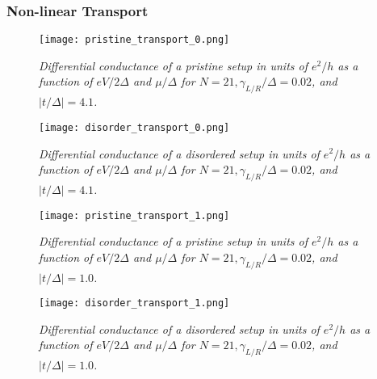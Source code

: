 \clearpage 

\subsubsection{Non-linear Transport} 

\vspace*{3cm}

\begin{figure}[h]
\centering
\texttt{[image: pristine\_transport\_0.png]}
\caption{\textit{Differential conductance of a pristine setup in units of $e^{2}/h$ as a function of $eV/2\Delta$ and $\mu/\Delta$ for $N = 21, \gamma_{L/R}/\Delta = 0.02$, and $|t/
\Delta| = 4.1$.}}
\end{figure}

\clearpage 

\vspace*{3cm}

\begin{figure}[h]
\centering
\texttt{[image: disorder\_transport\_0.png]}
\caption{\textit{Differential conductance of a disordered setup in units of $e^{2}/h$ as a function of $eV/2\Delta$ and $\mu/\Delta$ for $N = 21, \gamma_{L/R}/\Delta = 0.02$, and $|t/
\Delta| = 4.1$.}}
\end{figure}

\clearpage 

\vspace*{3cm}

\begin{figure}[h]
\centering
\texttt{[image: pristine\_transport\_1.png]}
\caption{\textit{Differential conductance of a pristine setup in units of $e^{2}/h$ as a function of $eV/2\Delta$ and $\mu/\Delta$ for $N = 21, \gamma_{L/R}/\Delta = 0.02$, and $|t/
\Delta| = 1.0$.}}
\end{figure}

\clearpage 

\vspace*{3cm}

\begin{figure}[h]
\centering
\texttt{[image: disorder\_transport\_1.png]}
\caption{\textit{Differential conductance of a disordered setup in units of $e^{2}/h$ as a function of $eV/2\Delta$ and $\mu/\Delta$ for $N = 21, \gamma_{L/R}/\Delta = 0.02$, and $|t/
\Delta| = 1.0$.}}
\end{figure}